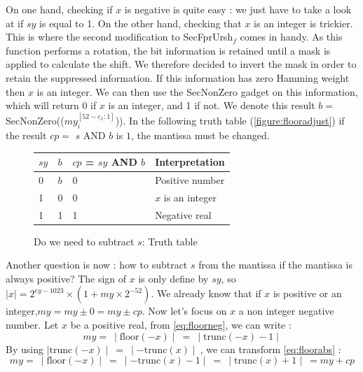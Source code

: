 \documentclass[runningheads]{llncs}
\begin{document}
  On one hand, checking if $x$ is negative is quite easy : we just have to take a look at if $sy$ is equal to 1.
  On the other hand, checking that $x$ is an integer is trickier. This is where the second modification to SecFprUrsh$_f$ comes in handy. As this function performs a rotation, the bit information is retained until a mask is applied to calculate the shift. 
  We therefore decided to invert the mask in order to retain the suppressed information. If this information has zero Hamming weight
  then $x$ is an integer. We can then use the SecNonZero gadget on this information, which will return $0$ if $x$ is an integer, and 1 if not.
  We denote this result $b=$ SecNonZero(($my_i^{[52 - c_x:1]}$)). 
  In the following truth table (\autoref{figure:flooradjust}) if the result $cp = $ $s$ AND $b$ is $1$, the mantissa must be changed.
  \begin{figure}
      \begin{center}
          \begin{tabular}{C{0.5cm} C{0.5cm} || C{3 cm} L{3cm}}
              \hline $sy$ & $b$ &$cp$ = $sy$ AND $b$ & Interpretation\\
               & $b$ & 0 & Positive number\\
              1 & 0  & 0 & $x$ is an integer\\
              1 & 1  & 1 & Negative real\\ \hline
          \end{tabular}
      \end{center}
      \caption{Do we need to subtract $s$: Truth table}
      \label{figure:flooradjust}
  \end{figure}
  Another question is now : how to subtract $s$ from the mantissa if the mantissa is always positive? 
  The sign of $x$ is only define by $sy$, so $\mid x\mid = 2^{ey-1023}\times(1 + my\times 2^{-52})$.
  We already know that if $x$ is positive or an integer,$my = my \pm 0 = my \pm cp$.
  Now let's focus on $x$ a non integer negative number. Let $x$ be a positive real, from \autoref{eq:floorneg}, we can write :
  \begin{equation}\label{eq:floorabs}
      my =\: \mid \text{floor}(-x)\mid \:=\: \mid \text{trunc}(-x) - 1\mid
  \end{equation}
  By using $\mid \text{trunc}(-x) \mid \:=\: \mid -\text{trunc}(x)\mid \:$, we can transform \autoref{eq:floorabs} :
  \begin{equation}\label{eq:floorabs2}
      my =\: \mid \text{floor}(-x)\mid \:=\: \mid -\text{trunc}(x) - 1\mid \:=\: \mid \text{trunc}(x) + 1\mid \:= my + cp
  \end{equation}
\end{document}
